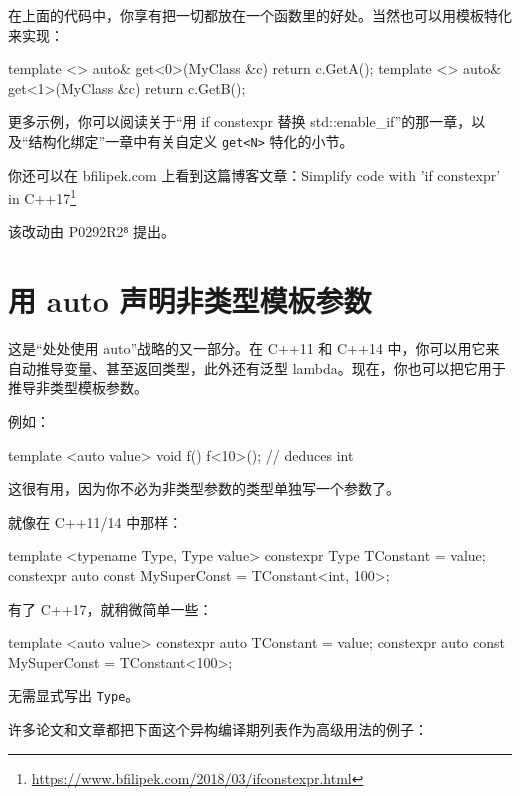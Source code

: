 在上面的代码中，你享有把一切都放在一个函数里的好处。当然也可以用模板特化来实现：

\begin{codebox}[cpp]
template <> auto& get<0>(MyClass &c) { return c.GetA(); }
template <> auto& get<1>(MyClass &c) { return c.GetB(); }
\end{codebox}

更多示例，你可以阅读关于“用 if constexpr 替换 std::enable\_if”的那一章，以及“结构化绑定”一章中有关自定义 \texttt{get<N>} 特化的小节。

你还可以在 bfilipek.com 上看到这篇博客文章：Simplify code with 'if constexpr' in C++17\footnote{\url{https://www.bfilipek.com/2018/03/ifconstexpr.html}}

\begin{myInfoBox}
该改动由 P0292R2⁸ 提出。
\end{myInfoBox}

\section{用 auto 声明非类型模板参数}

这是“处处使用 auto”战略的又一部分。在 C++11 和 C++14 中，你可以用它来自动推导变量、甚至返回类型，此外还有泛型 lambda。现在，你也可以把它用于推导非类型模板参数。

例如：

\begin{codebox}[cpp]
template <auto value> void f() { }
f<10>();
// deduces int
\end{codebox}

这很有用，因为你不必为非类型参数的类型单独写一个参数了。

就像在 C++11/14 中那样：

\begin{codebox}[cpp]
template <typename Type, Type value> constexpr Type TConstant = value;
constexpr auto const MySuperConst = TConstant<int, 100>;
\end{codebox}

有了 C++17，就稍微简单一些：

\begin{codebox}[cpp]
template <auto value> constexpr auto TConstant = value;
constexpr auto const MySuperConst = TConstant<100>;
\end{codebox}

无需显式写出 \texttt{Type}。

许多论文和文章都把下面这个异构编译期列表作为高级用法的例子：

